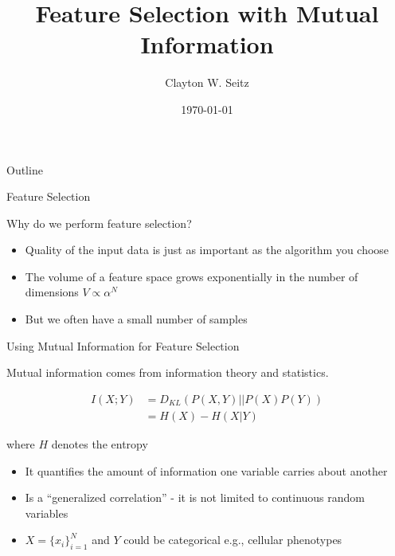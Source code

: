 \documentclass{beamer}					%
\title{Feature Selection with Mutual Information}	%
\author{Clayton W. Seitz}								%
\date{\today}									%
\begin{document}
\begin{frame}
  \titlepage
\end{frame}

\begin{frame}{Outline}
  \tableofcontents
\end{frame}

%

\begin{frame}{Feature Selection}

Why do we perform feature selection? \\
\vspace{0.2in}
\begin{itemize}
\item Quality of the input data is just as important as the algorithm you choose
\item The volume of a feature space grows exponentially in the number of dimensions $V \propto \alpha^{N}$
\item But we often have a small number of samples
\end{itemize}

\end{frame}


\begin{frame}{Using Mutual Information for Feature Selection}

Mutual information comes from information theory and statistics.

\begin{align*}
I(X;Y) &= D_{KL}(P(X,Y)||P(X)P(Y))\\
&= H(X) - H(X|Y)
\end{align*}

where $H$ denotes the entropy\\
\vspace{0.1in}

\begin{itemize}
\item It quantifies the amount of information one variable carries about another
\item Is a ``generalized correlation'' - it is not limited to continuous random variables
\item $X = \{x_{i}\}_{i=1}^{N}$ and $Y$ could be categorical e.g., cellular phenotypes
\end{itemize}

\end{frame}
\end{document}
